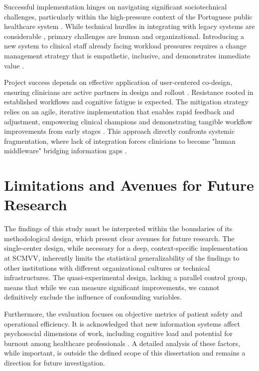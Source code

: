 Successful implementation hinges on navigating significant sociotechnical challenges, particularly within the high-pressure context of the Portuguese public healthcare system \cite{goiana2024portuguese}. While technical hurdles in integrating with legacy systems are considerable \cite{keasberry2017}, primary challenges are human and organizational. Introducing a new system to clinical staff already facing workload pressures requires a change management strategy that is empathetic, inclusive, and demonstrates immediate value \cite{rogers2003}.

Project success depends on effective application of user-centered co-design, ensuring clinicians are active partners in design and rollout \cite{venkatesh2003}. Resistance rooted in established workflows and cognitive fatigue is expected. The mitigation strategy relies on an agile, iterative implementation that enables rapid feedback and adjustment, empowering clinical champions and demonstrating tangible workflow improvements from early stages \cite{may2013}. This approach directly confronts systemic fragmentation, where lack of integration forces clinicians to become "human middleware" bridging information gaps \cite{pinto2016identification}.

\section{Limitations and Avenues for Future Research}

The findings of this study must be interpreted within the boundaries of its methodological design, which present clear avenues for future research. The single-center design, while necessary for a deep, context-specific implementation at SCMVV, inherently limits the statistical generalizability of the findings to other institutions with different organizational cultures or technical infrastructures. The quasi-experimental design, lacking a parallel control group, means that while we can measure significant improvements, we cannot definitively exclude the influence of confounding variables.

Furthermore, the evaluation focuses on objective metrics of patient safety and operational efficiency. It is acknowledged that new information systems affect psychosocial dimensions of work, including cognitive load and potential for burnout among healthcare professionals \cite{hertzum2022}. A detailed analysis of these factors, while important, is outside the defined scope of this dissertation and remains a direction for future investigation.

